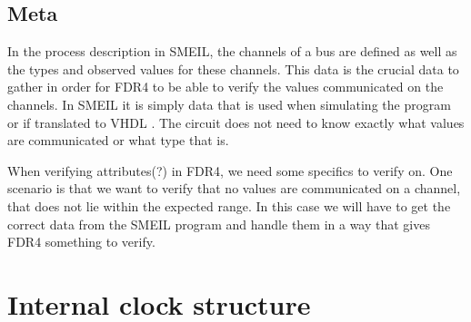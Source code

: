 \subsection{Meta}

In the process description in SMEIL, the channels of a bus are defined as well as the types and observed values for these channels. This data is the crucial data to gather in order for FDR4 to be able to verify the values communicated on the channels. In SMEIL it is simply data that is used when simulating the program or if translated to VHDL
. The circuit does not need to know exactly what values are communicated or what type that is.


When verifying attributes(?) in FDR4, we need some specifics to verify on. One scenario is that we want to verify that no values are communicated on a channel, that does not lie within the expected range. In this case we will have to get the correct data from the SMEIL program and handle them in a way that gives FDR4 something to verify.

\section{Internal clock structure} \label{sec:analysis_clock}
